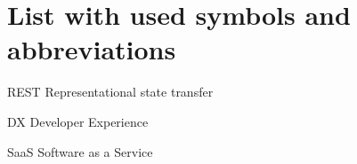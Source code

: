 
\section*{List with used symbols and abbreviations}

\begin{abbreviations}
\item[REST] Representational state transfer\cite{fielding2000architectural}
\item[DX] Developer Experience
\item[SaaS] Software as a Service
\end{abbreviations}
